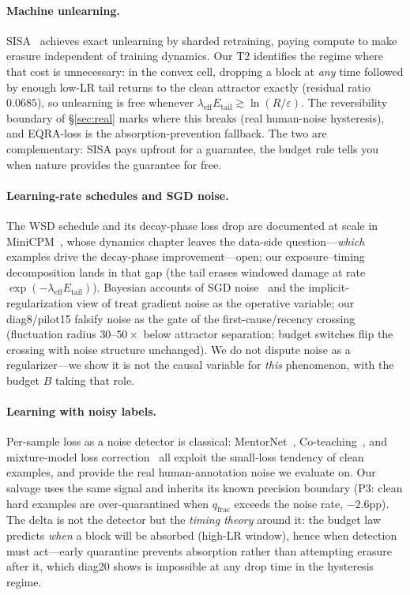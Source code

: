 \documentclass{article}
\newcommand{\B}{B}            %
\newcommand{\lam}{\lambda}
\newcommand{\lameff}{\lam_{\mathrm{eff}}}
\begin{document}
\paragraph{Machine unlearning.} SISA~\citep{bourtoule2021sisa} achieves exact unlearning by
sharded retraining, paying compute to make erasure independent of training dynamics. Our T2
identifies the regime where that cost is unnecessary: in the convex cell, dropping a block at
\emph{any} time followed by enough low-LR tail returns to the clean attractor exactly
(residual ratio $0.0685$), so unlearning is free whenever
$\lameff E_{\mathrm{tail}}\gtrsim\ln(R/\varepsilon)$. The reversibility boundary of
\S\ref{sec:real} marks where this breaks (real human-noise hysteresis), and EQRA-loss is the
absorption-prevention fallback. The two are complementary: SISA pays upfront for a guarantee,
the budget rule tells you when nature provides the guarantee for free.

\paragraph{Learning-rate schedules and SGD noise.} The WSD schedule and its decay-phase loss
drop are documented at scale in MiniCPM~\citep{hu2024minicpm}, whose dynamics chapter leaves
the data-side question---\emph{which} examples drive the decay-phase improvement---open; our
exposure--timing decomposition lands in that gap (the tail erases windowed damage at rate
$\exp(-\lameff E_{\mathrm{tail}})$). Bayesian accounts of SGD
noise~\citep{mandt2017sgd,smith2017bayesian} and the implicit-regularization view of
\citep{smith2021origin} treat gradient noise as the operative variable; our diag8/pilot15
falsify noise as the gate of the first-cause/recency crossing (fluctuation radius
$30$--$50\times$ below attractor separation; budget switches flip the crossing with noise
structure unchanged). We do not dispute noise as a regularizer---we show it is not the causal
variable for \emph{this} phenomenon, with the budget $\B$ taking that role.

\paragraph{Learning with noisy labels.} Per-sample loss as a noise detector is classical:
MentorNet~\citep{jiang2018mentornet}, Co-teaching~\citep{han2018coteaching}, and mixture-model
loss correction~\citep{arazo2019unsupervised} all exploit the small-loss tendency of clean
examples, and \citet{wei2022cifar10n} provide the real human-annotation noise we evaluate on.
Our salvage uses the same signal and inherits its known precision boundary (P3: clean hard
examples are over-quarantined when $q_{\text{frac}}$ exceeds the noise rate, $-2.6$pp). The
delta is not the detector but the \emph{timing theory} around it: the budget law predicts
\emph{when} a block will be absorbed (high-LR window), hence when detection must act---early
quarantine prevents absorption rather than attempting erasure after it, which diag20 shows is
impossible at any drop time in the hysteresis regime.
\end{document}
